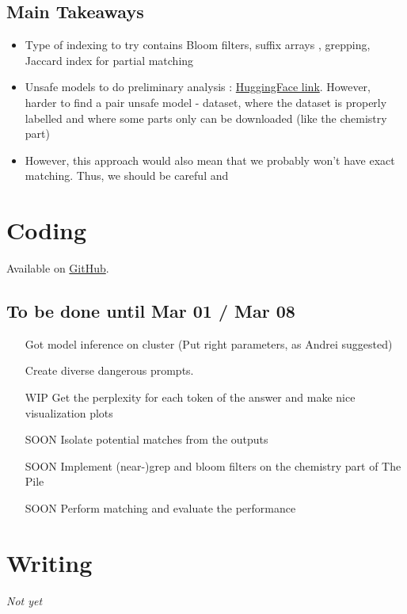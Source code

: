 \documentclass[a4paper,12pt]{article}
\begin{document}
\subsection*{Main Takeaways}
\begin{itemize}
    \item Type of indexing to try contains Bloom filters\cite{marone_data_2023}, suffix arrays \cite{lee_deduplicating_2022}, grepping\cite{marone_data_2023}, Jaccard index for partial matching \cite{lee_deduplicating_2022}
    \item Unsafe models to do preliminary analysis : \href{https://huggingface.co/spaces/DontPlanToEnd/UGI-Leaderboard}{HuggingFace link}. However, harder to find a pair unsafe model - dataset, where the dataset is properly labelled and where some parts only can be downloaded (like the chemistry part)
    \item However, this approach would also mean that we probably won't have exact matching. Thus, we should be careful and 
\end{itemize}



\section*{Coding }
Available on \href{https://github.com/Reliable-Information-Lab-HEVS/HAIDI-Graphs}{GitHub}. 
\subsection*{To be done until Mar 01 / Mar 08}
\begin{itemize}
    \item [\color{ForestGreen}{DONE}] Got model inference on cluster (Put right parameters, as Andrei suggested)
    \item [\color{Goldenrod}{WIP}] Create diverse dangerous prompts.
    \item [\color{Goldenrod}WIP] Get the perplexity for each token of the answer and make nice visualization plots
    \item [\color{BrickRed}SOON] Isolate potential matches from the outputs
    \item [\color{BrickRed}SOON] Implement (near-)grep and bloom filters on the chemistry part of The Pile
    \item [\color{BrickRed}SOON] Perform matching and evaluate the performance
\end{itemize}

\section*{Writing }
\textit{Not yet}
\end{document}
